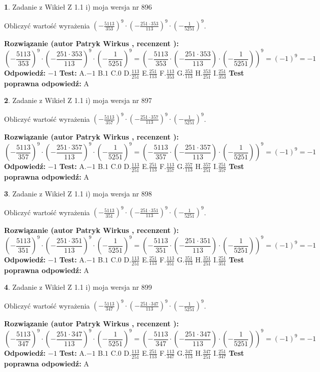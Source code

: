 \documentclass[12pt, a4paper]{article}
\theoremstyle{definition} %
\newtheorem{zad}{}
\newcommand{\zadStart}[1]{\begin{zad}#1\newline}
\newcommand{\zadStop}{\end{zad}}
\newcommand{\rozwStart}[2]{\noindent \textbf{Rozwiązanie (autor #1 , recenzent #2): }\newline}
\newcommand{\rozwStop}{\newline}
\newcommand{\odpStart}{\noindent \textbf{Odpowiedź:}\newline}
\newcommand{\odpStop}{\newline}
\newcommand{\testStart}{\noindent \textbf{Test:}\newline}
\newcommand{\testStop}{\newline}
\newcommand{\kluczStart}{\noindent \textbf{Test poprawna odpowiedź:}\newline}
\newcommand{\kluczStop}{\newline}
\begin{document}
\zadStart{Zadanie z Wikieł Z 1.1 i) moja wersja nr 896}

Obliczyć wartość wyrażenia $(-\frac{5113}{353})^{9} \cdot (-\frac{251 \cdot 353}{113})^{9} \cdot (-\frac{1}{5251})^{9}$.
\zadStop
\rozwStart{Patryk Wirkus}{}
$$(-\frac{5113}{353})^{9} \cdot (-\frac{251 \cdot 353}{113})^{9} \cdot (-\frac{1}{5251})^{9} = (-\frac{5113}{353} \cdot (-\frac{251 \cdot 353}{113}) \cdot (-\frac{1}{5251}))^{9} = (-1)^{9} = -1$$
\rozwStop
\odpStart
$-1$
\odpStop
\testStart
A.$-1$ B.$1$ C.$0$ D.$\frac{113}{251}$ E.$\frac{251}{113}$
F.$\frac{113}{353}$ G.$\frac{353}{113}$
H.$\frac{353}{251}$
I.$\frac{251}{353}$
\testStop
\kluczStart
A
\kluczStop



\zadStart{Zadanie z Wikieł Z 1.1 i) moja wersja nr 897}

Obliczyć wartość wyrażenia $(-\frac{5113}{357})^{9} \cdot (-\frac{251 \cdot 357}{113})^{9} \cdot (-\frac{1}{5251})^{9}$.
\zadStop
\rozwStart{Patryk Wirkus}{}
$$(-\frac{5113}{357})^{9} \cdot (-\frac{251 \cdot 357}{113})^{9} \cdot (-\frac{1}{5251})^{9} = (-\frac{5113}{357} \cdot (-\frac{251 \cdot 357}{113}) \cdot (-\frac{1}{5251}))^{9} = (-1)^{9} = -1$$
\rozwStop
\odpStart
$-1$
\odpStop
\testStart
A.$-1$ B.$1$ C.$0$ D.$\frac{113}{251}$ E.$\frac{251}{113}$
F.$\frac{113}{357}$ G.$\frac{357}{113}$
H.$\frac{357}{251}$
I.$\frac{251}{357}$
\testStop
\kluczStart
A
\kluczStop



\zadStart{Zadanie z Wikieł Z 1.1 i) moja wersja nr 898}

Obliczyć wartość wyrażenia $(-\frac{5113}{351})^{9} \cdot (-\frac{251 \cdot 351}{113})^{9} \cdot (-\frac{1}{5251})^{9}$.
\zadStop
\rozwStart{Patryk Wirkus}{}
$$(-\frac{5113}{351})^{9} \cdot (-\frac{251 \cdot 351}{113})^{9} \cdot (-\frac{1}{5251})^{9} = (-\frac{5113}{351} \cdot (-\frac{251 \cdot 351}{113}) \cdot (-\frac{1}{5251}))^{9} = (-1)^{9} = -1$$
\rozwStop
\odpStart
$-1$
\odpStop
\testStart
A.$-1$ B.$1$ C.$0$ D.$\frac{113}{251}$ E.$\frac{251}{113}$
F.$\frac{113}{351}$ G.$\frac{351}{113}$
H.$\frac{351}{251}$
I.$\frac{251}{351}$
\testStop
\kluczStart
A
\kluczStop



\zadStart{Zadanie z Wikieł Z 1.1 i) moja wersja nr 899}

Obliczyć wartość wyrażenia $(-\frac{5113}{347})^{9} \cdot (-\frac{251 \cdot 347}{113})^{9} \cdot (-\frac{1}{5251})^{9}$.
\zadStop
\rozwStart{Patryk Wirkus}{}
$$(-\frac{5113}{347})^{9} \cdot (-\frac{251 \cdot 347}{113})^{9} \cdot (-\frac{1}{5251})^{9} = (-\frac{5113}{347} \cdot (-\frac{251 \cdot 347}{113}) \cdot (-\frac{1}{5251}))^{9} = (-1)^{9} = -1$$
\rozwStop
\odpStart
$-1$
\odpStop
\testStart
A.$-1$ B.$1$ C.$0$ D.$\frac{113}{251}$ E.$\frac{251}{113}$
F.$\frac{113}{347}$ G.$\frac{347}{113}$
H.$\frac{347}{251}$
I.$\frac{251}{347}$
\testStop
\kluczStart
A
\kluczStop
\end{document}
